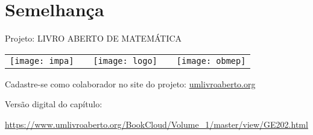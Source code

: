 \ifnum{}
\renewcommand\chapterillustration{abertura-semelhanca}
\else
\renewcommand\chapterillustration{abertura-semelhanca-professor}
\fi
\renewcommand\chapterwhat{São estudadas a semelhança de figuras geométricas, os casos de semelhança de triângulos e polígonos, e suas aplicações.}

\renewcommand\chapterbecause{Em primeiro lugar, o conceito de semelhança está presente em diversos contextos e sua compreensão permite compreender melhor o mundo que vivemos. Por outro lado, a semelhança de triângulos é um instrumento importante para obter propriedades métricas e relações entre elementos de polígonos. Por fim, a semelhança de triângulos é uma ferramenta muito útil na resolução de problemas de geometria, tanto plana quanto no espaço.}

\chapter{Semelhança}

\mbox{}\thispagestyle{empty}\clearpage

\thispagestyle{empty}

\begin{center}
Projeto: LIVRO ABERTO DE MATEMÁTICA

\noindent \begin{tabular}{lcccr}
\texttt{[image: impa]}& \quad\quad& \texttt{[image: logo]} & \quad\quad& \texttt{[image: obmep]} 
\end{tabular}
\end{center}

\vspace*{.3cm}

Cadastre-se como colaborador no site do projeto: \url{umlivroaberto.org}

Versão digital do capítulo:

\url{https://www.umlivroaberto.org/BookCloud/Volume_1/master/view/GE202.html}


